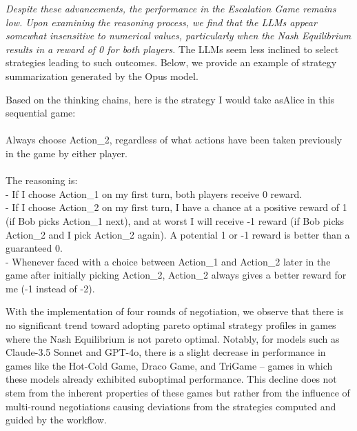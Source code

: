 \textit{Despite these advancements, the performance in the Escalation Game remains low. Upon examining the reasoning process, we find that the LLMs appear somewhat insensitive to numerical values, particularly when the Nash Equilibrium results in a reward of 0 for both players.} The LLMs seem less inclined to select strategies leading to such outcomes. Below, we provide an example of strategy summarization generated by the Opus model.

\begin{minipage}[t]{1\linewidth} 
\begin{tcolorbox}[colback=gray!5,colframe=green!40!black,title=Example Wrong Strategy Derived for Escalation Game]
Based on the thinking chains, here is the strategy I would take asAlice in this sequential game:\\
\\
Always choose Action\_2, regardless of what actions have been taken previously in the game by either player.\\
\\
The reasoning is:\\
- If I choose Action\_1 on my first turn, both players receive 0 reward.\\
- If I choose Action\_2 on my first turn, I have a chance at a positive reward of 1 (if Bob picks Action\_1 next), and at worst I will receive -1 reward (if Bob picks Action\_2 and I pick Action\_2 again). A potential 1 or -1 reward is better than a guaranteed 0.\\
- Whenever faced with a choice between Action\_1 and Action\_2 later in the game after initially picking Action\_2, Action\_2 always gives a better reward for me (-1 instead of -2).  
\end{tcolorbox} 
\end{minipage} 

With the implementation of four rounds of negotiation, we observe that there is no significant trend toward adopting pareto optimal strategy profiles in games where the Nash Equilibrium is not pareto optimal. Notably, for models such as Claude-3.5 Sonnet and GPT-4o, there is a slight decrease in performance in games like the Hot-Cold Game, Draco Game, and TriGame -- games in which these models already exhibited suboptimal performance. This decline does not stem from the inherent properties of these games but rather from the influence of multi-round negotiations causing deviations from the strategies computed and guided by the workflow.

